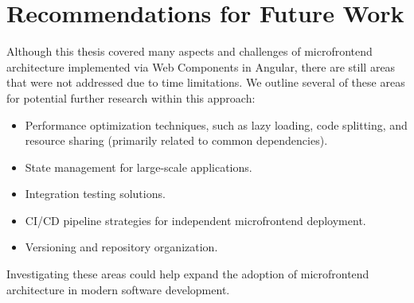 \section{Recommendations for Future Work}
Although this thesis covered many aspects and challenges of microfrontend architecture implemented via Web Components in Angular, there are still areas that were not addressed due to time limitations. We outline several of these areas for potential further research within this approach:
\begin{itemize} 
    \item Performance optimization techniques, such as lazy loading, code splitting, and resource sharing (primarily related to common dependencies). 
    \item State management for large-scale applications. 
    \item Integration testing solutions. 
    \item CI/CD pipeline strategies for independent microfrontend deployment. 
    \item Versioning and repository organization. 
\end{itemize}
Investigating these areas could help expand the adoption of microfrontend architecture in modern software development.